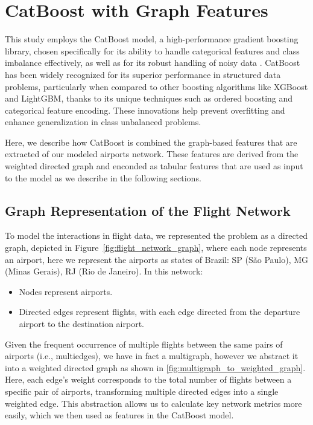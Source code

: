 \section{CatBoost with Graph Features}
\label{sec:catboost_model}

This study employs the CatBoost model, a high-performance gradient
boosting library, chosen specifically for its ability to handle
categorical features and class imbalance effectively, as well as for
its robust handling of noisy data
\cite{prokhorenkova2018catboost}. CatBoost has been widely recognized
for its superior performance in structured data problems, particularly
when compared to other boosting algorithms like XGBoost and LightGBM,
thanks to its unique techniques such as ordered boosting and
categorical feature encoding. These innovations help prevent
overfitting and enhance generalization in class unbalanced problems.

Here, we describe how CatBoost is combined the graph-based features
that are extracted of our modeled airports network. These features are
derived from the weighted directed graph and enconded as tabular
features that are used as input to the model as we describe in the
following sections.


\subsection{Graph Representation of the Flight Network}



To model the interactions in flight data, we represented the problem
as a directed graph, depicted in
Figure~\ref{fig:flight_network_graph}, where each node represents an
airport, here we represent the airports as states of Brazil: SP (São
Paulo), MG (Minas Gerais), RJ (Rio de Janeiro). In this network:
\begin{itemize}
\item Nodes represent airports.
\item Directed edges represent flights, with each edge directed from
the departure airport to the destination airport.
\end{itemize} Given the frequent occurrence of multiple flights
between the same pairs of airports (i.e., multiedges), we have in fact
a multigraph, however we abstract it into a weighted directed graph as
shown in \ref{fig:multigraph_to_weighted_graph}. Here, each edge's
weight corresponds to the total number of flights between a specific
pair of airports, transforming multiple directed edges into a single
weighted edge. This abstraction allows us to calculate key network
metrics more easily, which we then used as features in the CatBoost
model.

